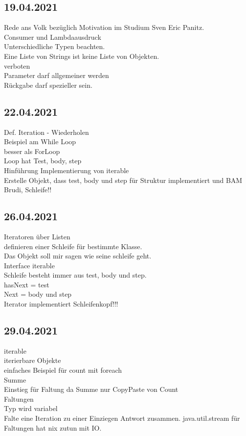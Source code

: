 \documentclass[paper=A4]{article}
\begin{document}
	\subsection*{19.04.2021}
	Rede ans Volk bezüglich Motivation im Studium Sven Eric Panitz. \\
	Consumer und Lambdaausdruck \\
	Unterschiedliche Typen beachten. \\
	Eine Liste von Strings ist keine Liste von Objekten. \\
	verboten \\
	Parameter darf allgemeiner werden \\
	Rückgabe darf spezieller sein. \\
	\subsection*{22.04.2021}
	Def. Iteration - Wiederholen \\
	Beispiel am While Loop \\
	besser als ForLoop \\
	Loop hat Test, body, step \\
	Hinführung Implementierung von iterable \\
	Erstelle Objekt, dass test, body und step für Struktur implementiert und BAM Brudi, Schleife!! \\
	\subsection*{26.04.2021}
	Iteratoren über Listen \\
	definieren einer Schleife für bestimmte Klasse. \\
	Das Objekt soll mir sagen wie seine schleife geht. \\
	Interface iterable \\
	Schleife besteht immer aus test, body und step. \\
	hasNext = test \\
	Next = body und step \\
	Iterator implementiert Schleifenkopf!!! \\
	\subsection*{29.04.2021}
	iterable \\
	iterierbare Objekte \\
	einfaches Beispiel für count mit foreach  \\
	Summe \\
	Einstieg für Faltung da Summe nur CopyPaste von Count \\
	Faltungen \\
	Typ wird variabel \\
	Falte eine Iteration zu einer Einziegen Antwort zusammen.
	java.util.stream für Faltungen hat nix zutun mit IO. \\
\end{document}
